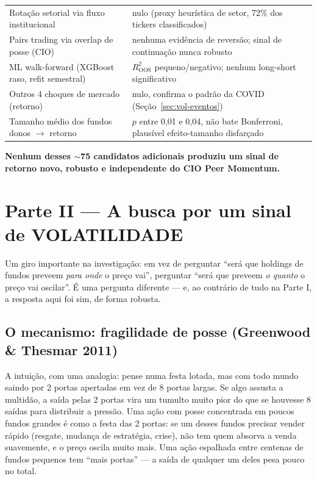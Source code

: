 \documentclass[11pt,a4paper]{article}
\begin{document}
\begin{longtable}{@{}p{5.5cm}p{7.2cm}@{}}
Rotação setorial via fluxo institucional & nulo (proxy heurística de setor, 72\% dos tickers classificados) \\
Pairs trading via overlap de posse (CIO) & nenhuma evidência de reversão; sinal de continuação nunca robusto \\
ML walk-forward (XGBoost raso, refit semestral) & $R^2_{\text{OOS}}$ pequeno/negativo; nenhum long-short significativo \\
Outros 4 choques de mercado (retorno) & nulo, confirma o padrão da COVID (Seção~\ref{sec:vol-eventos}) \\
Tamanho médio dos fundos donos $\to$ retorno & $p$ entre 0,01 e 0,04, não bate Bonferroni, plausível efeito-tamanho disfarçado \\
\bottomrule
\end{longtable}

\textbf{Nenhum desses $\sim$75 candidatos adicionais produziu um sinal de
retorno novo, robusto e independente do CIO Peer Momentum.}

\section{Parte II --- A busca por um sinal de VOLATILIDADE}
\label{sec:vol}

Um giro importante na investigação: em vez de perguntar ``será que
holdings de fundos preveem \emph{para onde} o preço vai'', perguntar
``será que preveem \emph{o quanto} o preço vai oscilar''. É uma pergunta
diferente --- e, ao contrário de tudo na Parte I, a resposta aqui foi sim,
de forma robusta.

\subsection{O mecanismo: fragilidade de posse (Greenwood \& Thesmar 2011)}

A intuição, com uma analogia: pense numa festa lotada, mas com todo mundo
saindo por 2 portas apertadas em vez de 8 portas largas. Se algo assusta a
multidão, a saída pelas 2 portas vira um tumulto muito pior do que se
houvesse 8 saídas para distribuir a pressão. Uma ação com posse
concentrada em poucos fundos grandes é como a festa das 2 portas: se um
desses fundos precisar vender rápido (resgate, mudança de estratégia,
crise), não tem quem absorva a venda suavemente, e o preço oscila muito
mais. Uma ação espalhada entre centenas de fundos pequenos tem ``mais
portas'' --- a saída de qualquer um deles pesa pouco no total.
\end{document}
